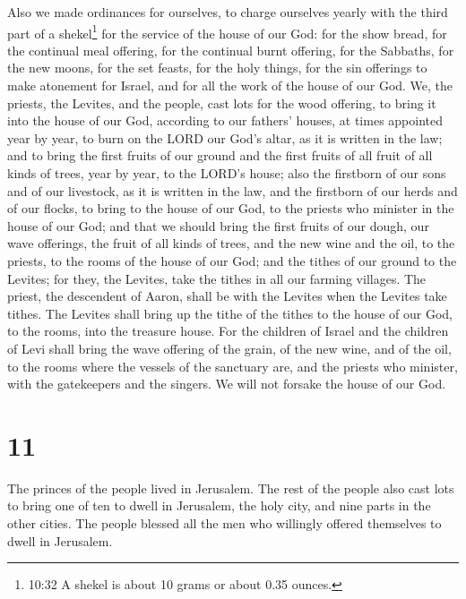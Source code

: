 Also we made ordinances for ourselves, to charge ourselves
yearly with the third part of a shekel\footnote{10:32 A shekel is about
  10 grams or about 0.35 ounces.} for the service of the house of our
God:  for the show bread, for the continual meal offering,
for the continual burnt offering, for the Sabbaths, for the new moons,
for the set feasts, for the holy things, for the sin offerings to make
atonement for Israel, and for all the work of the house of our God.
 We, the priests, the Levites, and the people, cast lots
for the wood offering, to bring it into the house of our God, according
to our fathers' houses, at times appointed year by year, to burn on the
LORD our God's altar, as it is written in the law;  and to
bring the first fruits of our ground and the first fruits of all fruit
of all kinds of trees, year by year, to the LORD's house; 
also the firstborn of our sons and of our livestock, as it is written in
the law, and the firstborn of our herds and of our flocks, to bring to
the house of our God, to the priests who minister in the house of our
God;  and that we should bring the first fruits of our
dough, our wave offerings, the fruit of all kinds of trees, and the new
wine and the oil, to the priests, to the rooms of the house of our God;
and the tithes of our ground to the Levites; for they, the Levites, take
the tithes in all our farming villages.  The priest, the
descendent of Aaron, shall be with the Levites when the Levites take
tithes. The Levites shall bring up the tithe of the tithes to the house
of our God, to the rooms, into the treasure house.  For the
children of Israel and the children of Levi shall bring the wave
offering of the grain, of the new wine, and of the oil, to the rooms
where the vessels of the sanctuary are, and the priests who minister,
with the gatekeepers and the singers. We will not forsake the house of
our God.

\hypertarget{section-10}{%
\section{11}\label{section-10}}

 The princes of the people lived in Jerusalem. The rest of
the people also cast lots to bring one of ten to dwell in Jerusalem, the
holy city, and nine parts in the other cities.  The people
blessed all the men who willingly offered themselves to dwell in
Jerusalem.

